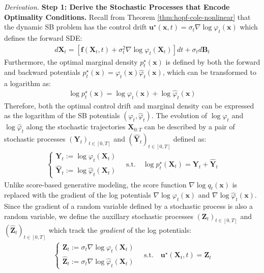 \documentclass{article}
\begin{document}
\textit{Derivation. } 
\textbf{Step 1: Derive the Stochastic Processes that Encode Optimality Conditions.} 
Recall from Theorem \ref{thm:hopf-cole-nonlinear} that the dynamic SB problem has the control drift $\boldsymbol{u}^\star(\boldsymbol{x},t)=\sigma_t\nabla \log \varphi_t(\boldsymbol{x})$ which defines the forward SDE:
\begin{align}
    d\boldsymbol{X}_t=\left[\boldsymbol{f}(\boldsymbol{X}_t,t)+ \sigma_t^2\nabla \log \varphi_t(\boldsymbol{X}_t)\right]dt+\sigma_t d\boldsymbol{B}_t
\end{align}
Furthermore, the optimal marginal density $p^\star_t(\boldsymbol{x})$ is defined by both the forward and backward potentials $p^\star_t(\boldsymbol{x})=\varphi_t(\boldsymbol{x}) \hat{\varphi}_t(\boldsymbol{x})$, which can be transformed to a logarithm as:
\begin{align}
    \log p^\star_t(\boldsymbol{x})=\log \varphi_t(\boldsymbol{x})+\log \hat{\varphi}_t(\boldsymbol{x})
\end{align}
Therefore, both the optimal control drift and marginal density can be expressed as the logarithm of the SB potentials $(\varphi_t, \hat\varphi_t)$. The evolution of $\log \varphi_t$ and $\log\hat\varphi_t$ along the stochastic trajectories $\boldsymbol{X}_{0:T}$ can be described by a pair of stochastic processes $(\boldsymbol{Y}_t)_{t\in [0,T]}$ and $(\widehat{\boldsymbol{Y}}_t)_{t\in [0,T]}$ defined as:
\begin{align}
\begin{cases}
    \boldsymbol{Y}_t:=\log \varphi_t(\boldsymbol{X}_t)\\
    \widehat{\boldsymbol{Y}}_t:=\log \hat{\varphi}_t(\boldsymbol{X}_t)
\end{cases}\quad \text{s.t.}\quad \log p^\star_t(\boldsymbol{X}_t)=\boldsymbol{Y}_t+\widehat{\boldsymbol{Y}}_t
\end{align}
Unlike score-based generative modeling, the score function $\nabla\log q_t(\boldsymbol{x})$ is replaced with the gradient of the log potentials $\nabla\log \varphi_t(\boldsymbol{x})$ and $\nabla\log \hat\varphi_t(\boldsymbol{x})$. Since the gradient of a random variable defined by a stochastic process is also a random variable, we define the auxillary stochastic processes $(\boldsymbol{Z}_t)_{t\in [0,T]}$ and $(\widehat{\boldsymbol{Z}}_t)_{t\in [0,T]}$ which track the \textit{gradient} of the log potentials:
\begin{align}
    \begin{cases}
        \boldsymbol{Z}_t:=\sigma_t\nabla \log \varphi_t(\boldsymbol{X}_t)\\
        \widehat{\boldsymbol{Z}}_t:=\sigma_t\nabla \log \hat{\varphi}_t(\boldsymbol{X}_t)
    \end{cases}\quad \text{s.t.}\quad \boldsymbol{u}^\star(\boldsymbol{X}_t,t)=\boldsymbol{Z}_t
\end{align}
\end{document}
